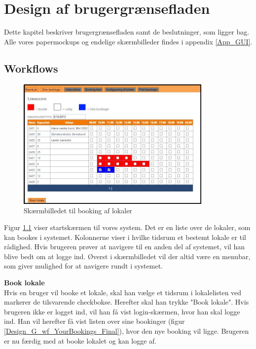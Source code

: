 \chapter{Design af brugergrænsefladen}
\label{Design_G}
Dette kapitel beskriver brugergrænsefladen samt de beslutninger, som ligger bag. Alle vores papermockups og endelige skærmbilleder findes i appendix \ref{App_GUI}.

\section{Workflows}
\label{Design_G_wf}
\label{Design_G_Development}
\begin{figure}[h!]
  \centering
    \includegraphics[width=0.85\textwidth]{Appendix/GUI-Prototype/DigitalMockup/GridEksempel}
  \caption{Skærmbilledet til booking af lokaler}
\label{Design_G_wf_FinalGrid}
\end{figure}

Figur \ref{Design_G_wf_FinalGrid} viser startskærmen til vores system. Det er en liste over de lokaler, som kan bookes i systemet. Kolonnerne viser i hvilke tidsrum et bestemt lokale er til rådighed. Hvis brugeren prøver at navigere til en anden del af systemet, vil han blive bedt om at logge ind. Øverst i skærmbilledet vil der altid være en menubar, som giver mulighed for at navigere rundt i systemet.

\textbf{Book lokale}
\\Hvis en bruger vil booke et lokale, skal han vælge et tidsrum i lokalelisten ved markerer de tilsvarende checkbokse. Herefter skal han trykke "Book lokale". Hvis brugeren ikke er logget ind, vil han få vist login-skærmen, hvor han skal logge ind. Han vil herefter få vist listen over sine bookinger (figur \ref{Design_G_wf_YourBookings_Final}), hvor den nye booking vil ligge. Brugeren er nu færdig med at booke lokalet og kan logge af. 

